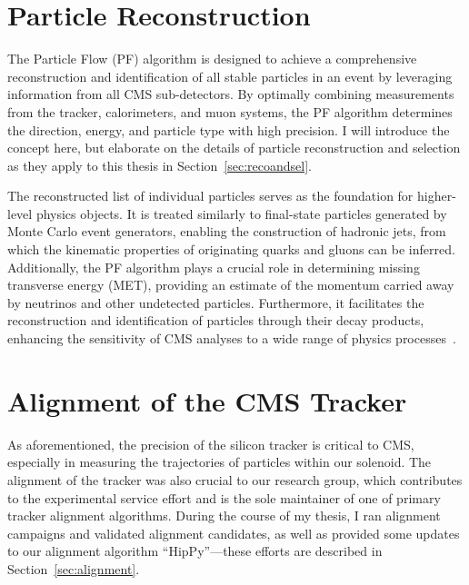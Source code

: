\section{Particle Reconstruction}

The Particle Flow (PF) algorithm is designed to achieve a comprehensive reconstruction and identification of all stable particles in an event by leveraging information from all CMS sub-detectors. By optimally combining measurements from the tracker, calorimeters, and muon systems, the PF algorithm determines the direction, energy, and particle type with high precision. I will introduce the concept here, but elaborate on the details of particle reconstruction and selection as they apply to this thesis in Section~\ref{sec:recoandsel}.

The reconstructed list of individual particles serves as the foundation for higher-level physics objects. It is treated similarly to final-state particles generated by Monte Carlo event generators, enabling the construction of hadronic jets, from which the kinematic properties of originating quarks and gluons can be inferred. Additionally, the PF algorithm plays a crucial role in determining missing transverse energy (MET), providing an estimate of the momentum carried away by neutrinos and other undetected particles. Furthermore, it facilitates the reconstruction and identification of particles through their decay products, enhancing the sensitivity of CMS analyses to a wide range of physics processes~\cite{Beaudette:1645993}.


\section{Alignment of the CMS Tracker}

As aforementioned, the precision of the silicon tracker is critical to CMS, especially in measuring the trajectories of particles within our solenoid. The alignment of the tracker was also crucial to our research group, which contributes to the experimental service effort and is the sole maintainer of one of primary tracker alignment algorithms. During the course of my thesis, I ran alignment campaigns and validated alignment candidates, as well as provided some updates to our alignment algorithm ``HipPy''---these efforts are described in Section~\ref{sec:alignment}.

